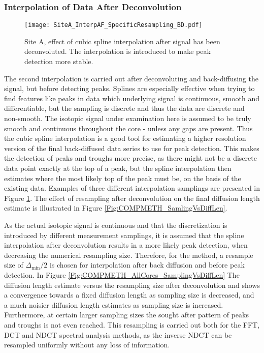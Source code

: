 \documentclass[../../CompleteThesis2/Complete_2ndDraft]{subfiles}
\begin{document}
\subsubsection[Interpolation 2]{Interpolation of Data After Deconvolution}
\label{Subsubsec:METH_Interpolation_AFdecon}
\begin{figure}[!htb]
	\centering
	\texttt{[image: SiteA\_InterpAF\_SpecificResampling\_BD.pdf]}
	\caption[Back diffused dat	a, Site A, different resamplings after deconvolution.]{\small Site A, effect of cubic spline interpolation after signal has been deconvoluted. The interpolation is introduced to make peak detection more stable.}
	\label{Fig:COMPMETH_SiteA_InterpAF_4samplings}
\end{figure}

The second interpolation is carried out after deconvoluting and back-diffusing the signal, but before detecting peaks. Splines are especially effective when trying to find features like peaks in data which underlying signal is continuous, smooth and differentiable, but the sampling is discrete and thus the data are discrete and non-smooth. The isotopic signal under examination here is assumed to be truly smooth and continuous throughout the core - unless any gaps are present. Thus the cubic spline interpolation is a good tool for estimating a higher resolution version of the final back-diffused data series to use for peak detection. This makes the detection of peaks and troughs more precise, as there might not be a discrete data point exactly at the top of a peak, but the spline interpolation then estimates where the most likely top of the peak must be, on the basis of the existing data. Examples of three different interpolation samplings are presented in Figure \ref{Fig:COMPMETH_SiteA_InterpAF_4samplings}. The effect of resampling after deconvolution on the final diffusion length estimate is illustrated in Figure \ref{Fig:COMPMETH_SamlingVsDiffLen}. 

As the actual isotopic signal is continuous and that the discretization is introduced by different measurement samplings, it is assumed that the spline interpolation after deconvolution results in a more likely peak detection, when decreasing the numerical resampling size. Therefore, for the method, a resample size of $\Delta_{\text{min}}/2$ is chosen for interpolation after back diffusion and before peak detection. In Figure \ref{Fig:COMPMETH_AllCores_SamplingVsDiffLen} The diffusion length estimate versus the resampling size after deconvolution and shows a convergence towards a fixed diffusion length as sampling size is decreased, and a much noisier diffusion length estimates as sampling size is increased. Furthermore, at certain larger sampling sizes the sought after pattern of peaks and troughs is not even reached. This resampling is carried out both for the FFT, DCT and NDCT spectral analysis methods, as the inverse NDCT can be resampled uniformly without any loss of information.
\end{document}
